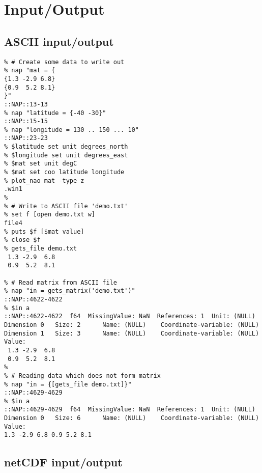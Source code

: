 
\section{Input/Output}

\subsection{ASCII input/output}

    \begin{verbatim}
% # Create some data to write out
% nap "mat = {
{1.3 -2.9 6.8}
{0.9  5.2 8.1}
}"
::NAP::13-13
% nap "latitude = {-40 -30}"
::NAP::15-15
% nap "longitude = 130 .. 150 ... 10"
::NAP::23-23
% $latitude set unit degrees_north
% $longitude set unit degrees_east
% $mat set unit degC
% $mat set coo latitude longitude
% plot_nao mat -type z
.win1
% 
% # Write to ASCII file 'demo.txt'
% set f [open demo.txt w]
file4
% puts $f [$mat value]
% close $f
% gets_file demo.txt
 1.3 -2.9  6.8
 0.9  5.2  8.1

% # Read matrix from ASCII file
% nap "in = gets_matrix('demo.txt')"
::NAP::4622-4622
% $in a
::NAP::4622-4622  f64  MissingValue: NaN  References: 1  Unit: (NULL)
Dimension 0   Size: 2      Name: (NULL)    Coordinate-variable: (NULL)
Dimension 1   Size: 3      Name: (NULL)    Coordinate-variable: (NULL)
Value:
 1.3 -2.9  6.8
 0.9  5.2  8.1
% 
% # Reading data which does not form matrix
% nap "in = {[gets_file demo.txt]}"
::NAP::4629-4629
% $in a
::NAP::4629-4629  f64  MissingValue: NaN  References: 1  Unit: (NULL)
Dimension 0   Size: 6      Name: (NULL)    Coordinate-variable: (NULL)
Value:
1.3 -2.9 6.8 0.9 5.2 8.1
\end{verbatim}

\subsection{netCDF input/output}

